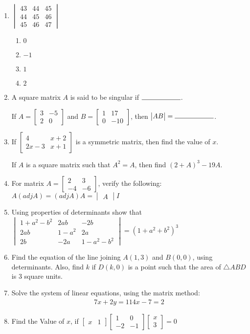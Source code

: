 \documentclass{article}
\newcommand{\myvec}[1]{\begin{bmatrix}#1\end{bmatrix}}
\newcommand{\mydet}[1]{\begin{vmatrix}#1\end{vmatrix}}
\begin{document}
\begin{enumerate}
   \item
    $\mydet{43 & 44 & 45 \\ 44 & 45 & 46 \\ 45 & 46 & 47}$
    \begin{enumerate}
        \item $0$
        \item $-1$
        \item $1$
        \item $2$
    \end{enumerate}

    \item A square matrix $A$ is said to be singular if $\rule{2cm}{0.15mm}$.

    If $A =\myvec{3 & -5 \\ 2 & 0}$ and 
    $B = \myvec{1 & 17 \\ 0 & -10}$, then $\mydet{AB} = \rule{2cm}{0.15mm}$.

    \item If $\myvec{4 & x+2 \\ 2x-3 & x+1}$ is a symmetric matrix, then find the value of $x$.

    If $A$ is a square matrix such that $A^2 = A$, then find $(2+A)^3 - 19A$.

    \item For matrix $A = \myvec{2 & 3 \\ -4 & -6}$, verify the following:
	    $A(adj A) = (adj A)A = \mydet{A}I$

    \item Using properties of determinants show that
    $\mydet{1 + a^2 - b^2 & 2ab & -2b \\ 2ab & 1 - a^2 & 2a \\ 2b & -2a & 1 - a^2 - b^2 } = (1 + a^2 + b^2)^3$

    \item Find the equation of the line joining $A(1, 3)$ and $B(0, 0)$, using determinants. Also, find $k$ if $D(k, 0)$ is a point such that the area of $\triangle{ABD}$ is $3$ square units.
    
    \item Solve the system of linear equations, using the matrix method:
    \begin{align*}
        7x + 2y = 11
        4x - 7 = 2
    \end{align*}
    
    \item Find the Value of $x$, if
    $\myvec{x & 1}
    \myvec{1 & 0 \\ -2 & -1}
    \myvec{x \\ 3} = 0$
    

\end{enumerate}
\end{document}
